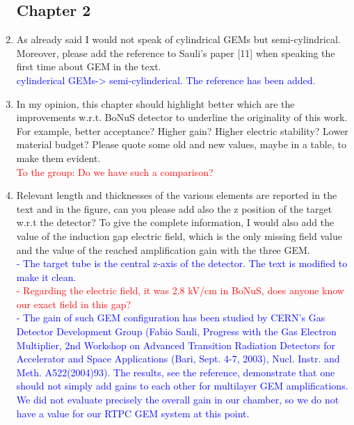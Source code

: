\documentclass[a4paper,11pt,twoside]{article}
\begin{document}
\begin{enumerate}

\subsection*{Chapter 2}
\item As already said I would not speak of cylindrical GEMs but 
   semi-cylindrical. Moreover, please add the reference to Sauli's paper [11] 
   when speaking the first time about GEM in the text.\\
\textcolor{blue}{cylinderical GEMs-> semi-cylinderical. The reference has been added.} 

\item In my opinion, this chapter should highlight better which are the 
   improvements w.r.t. BoNuS detector to underline the originality of this 
   work. For example, better acceptance? Higher gain? Higher electric 
   stability? Lower material budget? Please quote some old and new values, 
   maybe in a table, to make them evident.\\
\textcolor{red}{To the group: Do we have such a comparison? } 

\item Relevant length and thicknesses of the various elements are reported in 
   the text and in the figure, can you please add also the z position of the 
   target w.r.t the detector? To give the complete information, I would also 
   add the value of the induction gap electric field, which is the only missing 
   field value and the value of the reached amplification gain with the three 
   GEM.\\
\textcolor{blue}{- The target tube is the central z-axis of the detector. The 
text is modified to make it clean.\\}
\textcolor{red}{- Regarding the electric field, it was 2.8 kV/cm in BoNuS, does 
anyone know our exact field in this gap?\\}
\textcolor{blue}{- The gain of such GEM configuration has been studied by 
   CERN's Gas Detector Development Group (Fabio Sauli, Progress with the Gas 
   Electron Multiplier, 2nd Workshop on Advanced Transition Radiation Detectors 
   for Accelerator and Space Applications (Bari, Sept. 4-7, 2003), Nucl. Instr. 
   and Meth. A522(2004)93). The results, see the reference, demonstrate that 
one should not simply add gains to each other for multilayer GEM 
amplifications.  We did not evaluate precisely the overall gain in our chamber, 
so we do not have a value for our RTPC GEM system at this point.}


\end{enumerate}
\end{document}
